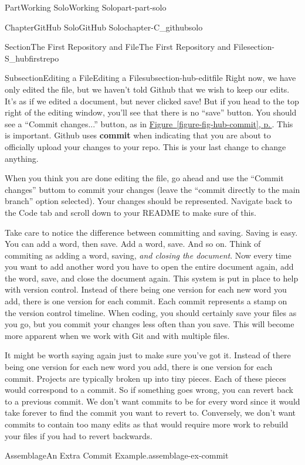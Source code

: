 \documentclass[twoside,10pt,]{book}
\newcommand{\xreffont}{\relax}
\newcommand{\terminology}[1]{\textbf{#1}}
\begin{document}
\begin{partptx}{Part}{Working Solo}{}{Working Solo}{}{}{part-part-solo}
\begin{chapterptx}{Chapter}{GitHub Solo}{}{GitHub Solo}{}{}{chapter-C_githubsolo}
\begin{sectionptx}{Section}{The First Repository and File}{}{The First Repository and File}{}{}{section-S_hubfirstrepo}
\begin{subsectionptx}{Subsection}{Editing a File}{}{Editing a File}{}{}{subsection-hub-editfile}
 Right now, we have only edited the file, but we haven't told Github that we wish to keep our edits. It's as if we edited a document, but never clicked save! But if you head to the top right of the editing window, you'll see that there is no ``save'' button. You should see a ``Commit changes...'' button, as in \hyperref[figure-fig-hub-commit]{Figure~{\xreffont\ref{figure-fig-hub-commit}}, p.\,\pageref{figure-fig-hub-commit}}. This is important. Github uses \terminology{commit} when indicating that you are about to officially upload your changes to your repo. This is your last change to change anything.%
\par
When you think you are done editing the file, go ahead and use the ``Commit changes'' buttom to commit your changes (leave the ``commit directly to the main branch'' option selected). Your changes should be represented. Navigate back to the Code tab and scroll down to your README to make sure of this.%
\par
Take care to notice the difference between committing and saving. Saving is easy. You can add a word, then save. Add a word, save. And so on. Think of commiting as adding a word, saving, \emph{and closing the document}. Now every time you want to add another word you have to open the entire document again, add the word, save, and close the document again. This system is put in place to help with version control. Instead of there being one version for each new word you add, there is one version for each commit. Each commit represents a stamp on the version control timeline. When coding, you should certainly save your files as you go, but you commit your changes less often than you save. This will become more apparent when we work with Git and with multiple files.%
\par
It might be worth saying again just to make sure you've got it. Instead of there being one version for each new word you add, there is one version for each commit. Projects are typically broken up into tiny pieces. Each of these pieces would correspond to a commit. So if something goes wrong, you can revert back to a previous commit. We don't want commits to be for every word since it would take forever to find the commit you want to revert to. Conversely, we don't want commits to contain too many edits as that would require more work to rebuild your files if you had to revert backwards.%
\begin{assemblage}{Assemblage}{An Extra Commit Example.}{assemblage-ex-commit}%

\end{assemblage}
\end{subsectionptx}
\end{sectionptx}
\end{chapterptx}
\end{partptx}
\end{document}
